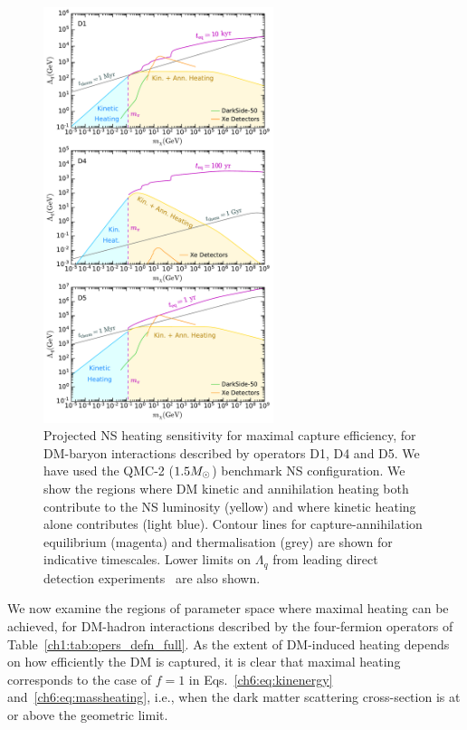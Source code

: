 \begin{figure}[t!bp]
    \centering
    \includegraphics[width=0.6\textwidth]{ann_heat_sensitivity_3ops.pdf}   
    \caption[Projected NS heating sensitivity for maximal capture efficiency, for DM-baryon interactions described by operators D1, D4 and D5.]{
    Projected NS heating sensitivity for maximal capture efficiency, for DM-baryon interactions described by operators D1, D4 and D5.  We have used the QMC-2 ($1.5M_\odot$) benchmark NS configuration.
    We show the regions where DM kinetic and annihilation heating both contribute to the NS luminosity (yellow) and where kinetic heating alone contributes (light blue).
    Contour lines for capture-annihilation equilibrium (magenta) and thermalisation (grey) are shown for indicative timescales.    
     Lower limits on $\Lambda_q$ from leading  direct detection experiments~\cite{DarkSide:2022dhx_mar_SearchDarkMatterNucleon,XENON:2020gfr_mar_SearchCoherentElastic,PandaX-4T:2021bab_dec_DarkMatterSearch,LZ:2022lsv_jul_FirstDarkMatter} are also shown.  
    }
    \label{ch6:fig:NS_heating}
\end{figure}

We now examine the regions of parameter space where maximal heating can be achieved, for DM-hadron interactions described by the four-fermion operators of Table~\ref{ch1:tab:opers_defn_full}. As the extent of DM-induced heating depends on how efficiently the DM is captured, it is clear that maximal heating corresponds to the case of $f=1$ in Eqs.~\ref{ch6:eq:kinenergy} and~\ref{ch6:eq:massheating}, i.e., when the dark matter scattering cross-section is at or above the geometric limit. 


